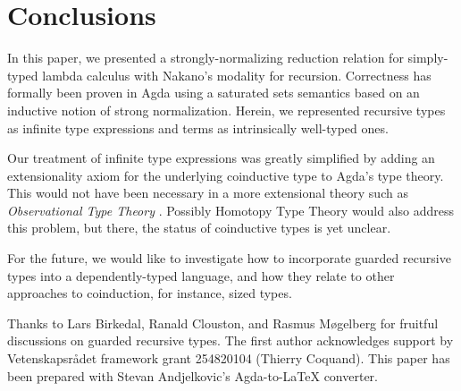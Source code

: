 
\section{Conclusions}
\label{sec:concl}

In this paper, we presented a strongly-normalizing reduction relation
for simply-typed lambda calculus with Nakano's modality for
recursion.  Correctness has formally been proven in Agda using a
saturated sets semantics based on an inductive notion of strong
normalization.  Herein, we represented recursive types as infinite
type expressions and terms as intrinsically well-typed ones.  

Our treatment of infinite type expressions was greatly simplified by
adding an extensionality axiom for the underlying coinductive type to
Agda's type theory.  This would not have been necessary in a more
extensional theory such as \emph{Observational Type Theory}
\citep{altenkirchMcBrideSwierstra:plpv07}.  Possibly Homotopy Type
Theory \citep{hott} 
would also address this problem, but there, the status of
coinductive types is yet unclear.

For the future, we would like to investigate how to incorporate
guarded recursive types into a dependently-typed language, and how
they relate to other approaches to coinduction, for instance, sized
types.

Thanks to Lars Birkedal, Ranald Clouston, and Rasmus M\o{}gelberg for
fruitful discussions on guarded recursive types.
The first author acknowledges support by Vetenskapsr\aa{}det framework
grant 254820104 (Thierry Coquand).  This paper has been prepared with
Stevan Andjelkovic's Agda-to-LaTeX converter. 



